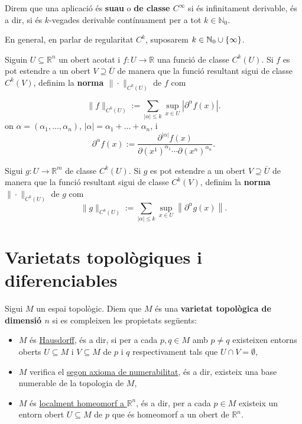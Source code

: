 \begin{defi}
    Direm que una aplicació és \textbf{suau} o \textbf{de classe $C^\infty$} si és infinitament derivable, és a dir, si és $k$-vegades derivable contínuament per a tot $k\in\mathbb N_0$.
\end{defi}

\begin{nota}
    En general, en parlar de regularitat $C^k$, suposarem $k\in\mathbb N_0\cup\{\infty\}$.
\end{nota}

\begin{defi}
    Siguin $U\subseteq \mathbb R^n$ un obert acotat i $f:U\to\mathbb R$ una funció de classe $C^k(U)$. Si $f$ es pot estendre a un obert $V\supseteq \overline U$ de manera que la funció resultant sigui de classe $C^k(V)$, definim la \textbf{norma $\|\cdot\|_{C^k(U)}$} de $f$ com

    \begin{equation*}
        \|f\|_{C^k(U)} := \sum_{|\alpha| \leq k} \sup_{x\in U} \left| \partial^\alpha f(x) \right|.
    \end{equation*}
    on $\alpha = (\alpha_1, \dots, \alpha_n)$, $|\alpha| = \alpha_1 + \dots + \alpha_n$, i
    \[
    \partial^\alpha f(x) := \frac{\partial^{|\alpha|} f(x)}{\partial (x^1)^{\alpha_1}\cdots\partial (x^n)^{\alpha_n}}.
    \]

    Sigui $g:U\to\mathbb{R}^m$ de classe $C^k(U)$. Si $g$ es pot estendre a un obert $V\supseteq \overline U$ de manera que la funció resultant sigui de classe $C^k(V)$, definim la \textbf{norma $\|\cdot\|_{C^k(U)}$} de $g$ com
    \begin{equation*}
        \|g\|_{C^k(U)} := \sum_{|\alpha| \leq k} \sup_{x\in U} \left\| \partial^\alpha g(x) \right\|.
    \end{equation*}    
\end{defi}

\section{Varietats topològiques i diferenciables}
\begin{defi} 
    Sigui $M$ un espai topològic. Diem que $M$ és una \textbf{varietat topològica de dimensió $n$} si es compleixen les propietats següents:
    \begin{itemize}
        \item $M$ és \underline{Hausdorff}, és a dir, si per a cada $p,q\in M$ amb $p\neq q$ existeixen entorns oberts $U\subseteq M$ i $V\subseteq M$ de $p$ i $q$ respectivament tals que $U\cap V = \emptyset$,
        \item $M$ verifica el \underline{segon axioma de numerabilitat}, és a dir, existeix una base numerable de la topologia de $M$,
        \item $M$ és \underline{localment homeomorf a $\mathbb R^n$}, és a dir, per a cada $p\in M$ existeix un entorn obert $U\subseteq M$ de $p$ que és homeomorf a un obert de $\mathbb R^n$.
    \end{itemize}
\end{defi}

